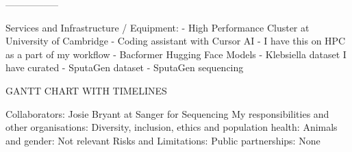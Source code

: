 —--------------



Services and Infrastructure / Equipment:
-  High Performance Cluster at University of Cambridge
-  Coding assistant with Cursor AI - I have this on HPC as a part of my workflow
-  Bacformer Hugging Face Models
	-  Klebsiella dataset I have curated
	-  SputaGen dataset
	-  SputaGen sequencing


GANTT CHART WITH TIMELINES

Collaborators:  Josie Bryant at Sanger for Sequencing 
My responsibilities and other organisations:
Diversity, inclusion, ethics and population health:
Animals and gender:  Not relevant
Risks and Limitations: 
Public partnerships: None




